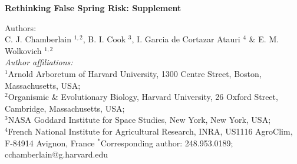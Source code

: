 \documentclass{article}\usepackage[]{graphicx}\usepackage[]{color}
\begin{document}
\noindent \textbf{\large{Rethinking False Spring Risk: Supplement}}

\noindent Authors:\\
C. J. Chamberlain $^{1,2}$, B. I. Cook $^{3}$, I. Garcia de Cortazar Atauri $^{4}$ \& E. M. Wolkovich $^{1,2}$
\vspace{2ex}\\
\emph{Author affiliations:}\\
$^{1}$Arnold Arboretum of Harvard University, 1300 Centre Street, Boston, Massachusetts, USA; \\
$^{2}$Organismic \& Evolutionary Biology, Harvard University, 26 Oxford Street, Cambridge, Massachusetts, USA; \\
$^{3}$NASA Goddard Institute for Space Studies, New York, New York, USA; \\
$^{4}$French National Institute for Agricultural Research, INRA, US1116 AgroClim, F-84914 Avignon, France
\vspace{2ex}
$^*$Corresponding author: 248.953.0189; cchamberlain@g.harvard.edu\\

\renewcommand{\thetable}{\arabic{table}}
\renewcommand{\thefigure}{\arabic{figure}}
\renewcommand{\labelitemi}{$-$}

\end{document}
